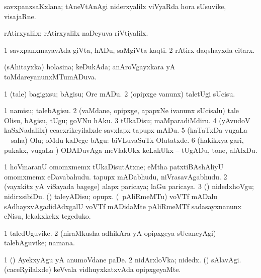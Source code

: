 \bentry
{}
\gl{\nA}
\bmng
savxpanxsaKxlana; tAneVtAnAgi niderxyalilx viVyaRda hora sUsuvike, visajaRne. 
\emng
\eentry

\bentry
{}
\gl{\kirxvi}
\bmng
rAtirxyalilx; rAtirxyalilx naDeyuva riVtiyalilx. 
\emng
\eentry

\bentry
{}
\gl{\nA}
\bmng
\bnum
\num{1} savxpanxmayavAda giVta, hADu, saMgiVta kaqti. 
\num{2} rAtirx daqshayxda citarx. 
\enum
\emng
\eentry

\bentry
{}
\gl{\gu}
\bmng
(sAhitayxka) holasina; keDukAda; anAroVgayxkara yA toMdareyanunxMTumADuva. 
\emng
\eentry

\bentry
{}
\gl{\sakirx}
\bmng
\bnum
\num{1} (tale) bagigxsu; bAgisu; Ore mADu. 
\num{2} (opipxge \mo vanunx) taletUgi sUcisu. 
\enum
\emng

\noindent
\gl{\akirx}
\bmng
\bnum
\num{1} namisu; talebAgisu. 
\num{2} (vaMdane, opipxge, apapxNe ivanunx sUcisalu) tale Olisu, bAgisu, tUgu; goVNu hAku. 
\num{3} tUkaDisu; maMparadiMdiru. 
\num{4} (yAvudoV kaSxNadalilx) ecacxrikeyilalxde savxlapx tapupx mADu. 
\num{5} (kaTaTxDa \mo vugaLa \vi\ \rUpa\ saha) Olu; oMdu kaDege bAgu:  biVLuvaSuTx Olutatxde. 
\num{6} (hakikxya gari, pukakx, \mo vugaLa \vi) ODADuvAga meVlakUkx keLakUkx -- tUgADu, tone, alAlxDu. 
\enum
\emng

\noindent
\gl{\pagu}
\bmng
\bnum
\num{1}  hoVmaranU omomxmemx tUkaDisutAtxne; eMtha patxtiBAshAliyU omomxmemx eDavabahudu. tapupx mADabhudu, niVrasavAgabhudu. 
\num{2} (vayxkitx yA viSayada bagege) alapx paricaya; laGu paricaya. 
\num{3} (\AmA) nidedxhoVgu; nidirxsibiDu. 
 (\AmA) 
\banum
{} taleyADisu; opupx. 
 (\birx\ pAliRmeMTu) voVTf mADalu sAdhayxvAgadidAdxgalU voVTf mADidaMte pAliRmeMTf sadasayxnanunx eNisu, lekakxkekx tegeduko. 
\eanum
\numie
\enum
\emng
\eentry

\bentry
{}
\gl{\nA}
\bmng
\bnum
\num{1} taledUguvike. 
\num{2} (niraMkusha adhikAra yA opipxgeya sUcaneyAgi) talebAguvike; namana. 
\enum
\emng

\noindent
\gl{\pagu}
\bmng
\bnum
\num{1}  (\ame) AyekxyAgu yA anumoVdane paDe. 
\num{2}  nidArxloVka; nidedx. 
  (\AmA) 
\banum
{} sAlavAgi. 
 (caceRyilalxde) keVvala vidhuyxkatxvAda opipxgeyaMte. 
\eanum
\numie
\enum
\emng
\eentry

